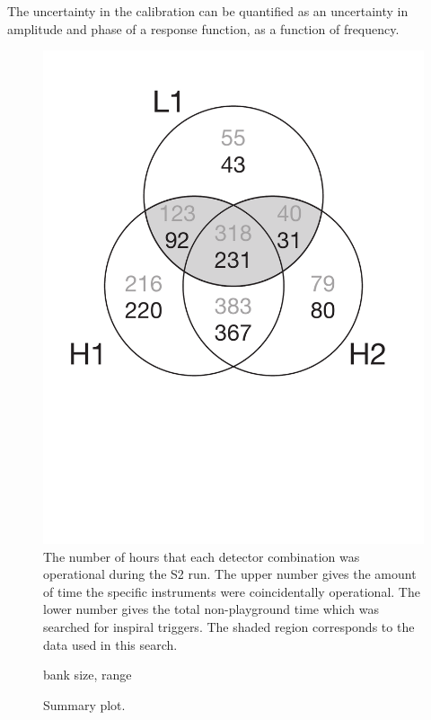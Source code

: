 The uncertainty in the calibration can be quantified as an uncertainty in
amplitude and phase of a response function, as a function of frequency.



\newpage

\begin{figure}[p]
\begin{center}
\includegraphics[width=\linewidth]{figures/result/s2_times}
\end{center}
\caption{\label{f:S2times}%
The number of hours that each detector combination was operational during the
S2 run.  The upper number gives the amount of time the specific instruments
were coincidentally operational.  The lower number gives the total
non-playground time which was searched for inspiral triggers.  The shaded
region corresponds to the data used in this search.}
\end{figure}

\begin{figure}[p]
\begin{center}
bank size, range
\end{center}
\caption{\label{f:inspiral_summary}%
Summary plot.}
\end{figure}


